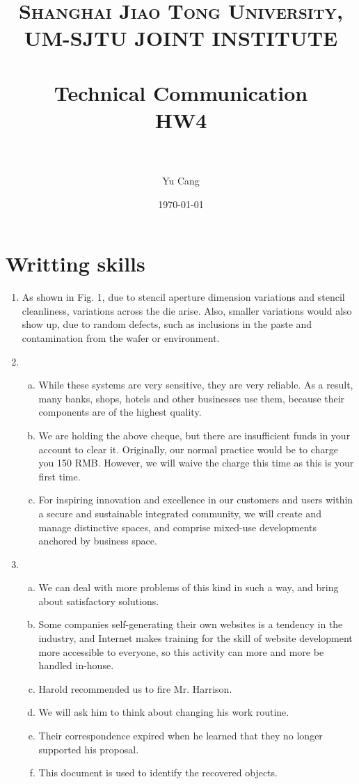 \documentclass[paper=a4, fontsize=11pt]{scrartcl} %
\title{	
\normalfont \normalsize 
\textsc{Shanghai Jiao Tong University, UM-SJTU JOINT INSTITUTE} \\ [25pt] %
\horrule{0.5pt} \\[0.4cm] %
\huge Technical Communication\\ HW4 \\ %
\horrule{2pt} \\[0.5cm] %
}
\author{Yu Cang \quad 018370210001} %
\date{\normalsize \today} %
\numberwithin{equation}{section} %
\numberwithin{figure}{section} %
\numberwithin{table}{section} %
\begin{document}
\maketitle %

\section{Writting skills}
	\begin{enumerate}
		\item 
			As shown in Fig. 1, due to stencil aperture dimension variations and stencil cleanliness, variations across the die arise. Also, smaller variations would also show up, due to random defects, such as inclusions in the paste and contamination from the wafer or environment.
		\item 
			\begin{enumerate}[(a)]
				\item 
					While these systems are very sensitive, they are very reliable. As a result, many banks, shops, hotels and other businesses use them, because their components are of the highest quality.
				\item 
					 We are holding the above cheque, but there are insufficient funds in your account to clear it. Originally, our normal practice would be to charge you 150 RMB. However, we will waive the charge this time as this is your first time.
				\item 
					 For inspiring innovation and excellence in our customers and users within a secure and sustainable integrated community, we will create and manage distinctive spaces, and comprise mixed-use developments anchored by business space.
			\end{enumerate}
		\item 
			\begin{enumerate}[(a)]
				\item 
					We can deal with more problems of this kind in such a way, and bring about satisfactory solutions.
				\item 
					Some companies self-generating their own websites is a tendency in the industry, and Internet makes training for the skill of website development more accessible to everyone, so this activity can more and more be handled in-house.
				\item 
					 Harold recommended us to fire Mr. Harrison.
				\item 
					We will ask him to think about changing his work routine.
				\item 
					Their correspondence expired when he learned that they no longer supported his proposal.
				\item 
					This document is used to identify the recovered objects.
			\end{enumerate}
	\end{enumerate}
\end{document}

